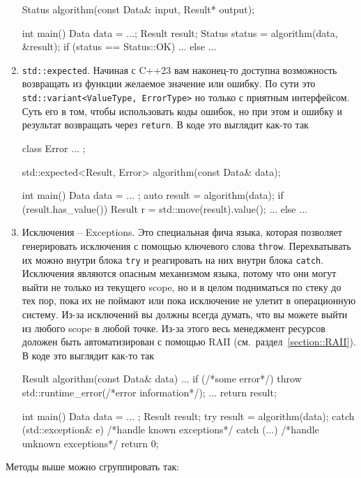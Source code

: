 \begin{enumerate}
\begin{cppcode}
Status algorithm(const Data& input, Result* output);

int main() {
  Data data = ...;
  Result result;
  Status status = algorithm(data, &result);
  if (status == Status::OK) {
    ...
  } else {
    ...
  }
}
\end{cppcode}


\item \verb"std::expected".
Начиная с C++23 вам наконец-то доступна возможность возвращать из функции желаемое значение или ошибку.
По сути это \verb"std::variant<ValueType, ErrorType>" но только с приятным интерфейсом.
Суть его в том, чтобы использовать коды ошибок, но при этом и ошибку и результат возвращать через \verb"return".
В коде это выглядит как-то так
\begin{cppcode}
class Error {
  ...
};

std::expected<Result, Error> algorithm(const Data& data);

int main() {
  Data data = ... ;
  auto result = algorithm(data);
  if (result.has_value()) {
    Result r = std::move(result).value();
    ...
  } else {
    ...
  }
}
\end{cppcode}

\item Исключения -- Exceptions.
Это специальная фича языка, которая позволяет генерировать исключения с помощью ключевого слова \verb"throw".
Перехватывать их можно внутри блока \verb"try" и реагировать на них внутри блока \verb"catch".
Исключения являются опасным механизмом языка, потому что они могут выйти не только из текущего scope, но и в целом подниматься по стеку до тех пор, пока их не поймают или пока исключение не улетит в операционную систему.
Из-за исключений вы должны всегда думать, что вы можете выйти из любого scope в любой точке.
Из-за этого весь менеджмент ресурсов доложен быть автоматизирован с помощью RAII (см.~раздел~\ref{section::RAII}).
В коде это выглядит как-то так
\begin{cppcode}
Result algorithm(const Data& data) {
  ...
  if (/*some error*/)
    throw std::runtime_error(/*error information*/);
  ...
  return result;
}

int main() {
  Data data = ... ;
  Result result;
  try {
    result = algorithm(data);
  } catch (std::exception& e) {
    /*handle known exceptions*/
  } catch (...) {
    /*handle unknown exceptions*/
  }
  return 0;
}
\end{cppcode}
\end{enumerate}
Методы выше можно сгруппировать так:
